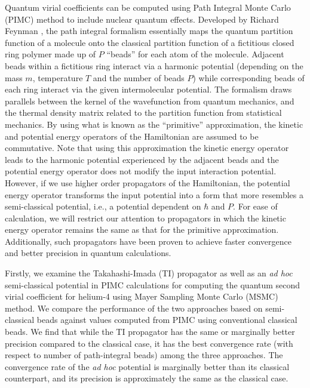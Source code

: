 Quantum virial coefficients can be computed using Path Integral Monte Carlo (PIMC) method to include nuclear quantum effects. Developed by Richard Feynman \cite{Feynman}, the path integral formalism essentially maps the quantum partition function of a molecule onto the classical partition function of a fictitious closed ring polymer made up of $P$ ``beads'' for each atom of the molecule. Adjacent beads within a fictitious ring interact via a harmonic potential (depending on the mass $m$, temperature $T$ and the number of beads $P$) while corresponding beads of each ring interact via the given intermolecular potential. The formalism draws parallels between the kernel of the wavefunction from quantum mechanics, and the thermal density matrix related to the partition function from statistical mechanics. By using what is known as the ``primitive'' approximation, the kinetic and potential energy operators of the Hamiltonian are assumed to be commutative. Note that using this approximation the kinetic energy operator leads to the harmonic potential experienced by the adjacent beads and the potential energy operator does not modify the input interaction potential. However, if we use higher order propagators of the Hamiltonian, the potential energy operator transforms the input potential into a form that more resembles a semi-classical potential, i.e., a potential dependent on $\hbar$ and $P$. For ease of calculation, we will restrict our attention to propagators in which the kinetic energy operator remains the same as that for the primitive approximation. Additionally, such propagators have been proven to achieve faster convergence and better precision in quantum calculations. 

Firstly, we examine the Takahashi-Imada \cite{Takahashi1984} (TI) propagator as well as an \emph{ad hoc} semi-classical potential in PIMC calculations for computing the quantum second virial coefficient for helium-4 using Mayer Sampling Monte Carlo \cite{Singh2004} (MSMC) method. We compare the performance of the two approaches based on semi-classical beads against values computed from PIMC using conventional classical beads. We find that while the TI propagator has the same or marginally better precision compared to the classical case, it has the best convergence rate (with respect to number of path-integral beads) among the three approaches. The convergence rate of the \emph{ad hoc} potential is marginally better than its classical counterpart, and its precision is approximately the same as the classical case.

